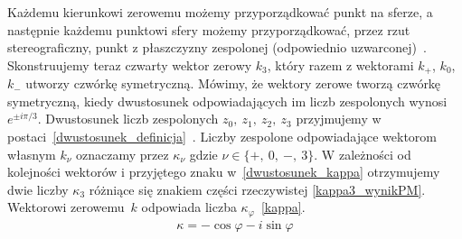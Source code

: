 Każdemu kierunkowi zerowemu możemy przyporządkować punkt na sferze,
a następnie każdemu punktowi sfery możemy przyporządkować,
przez rzut stereograficzny, 
punkt z płaszczyzny zespolonej 
(odpowiednio uzwarconej)~\cite{star1993algebra}.
Skonstruujemy teraz czwarty wektor zerowy $k_3$, który razem z 
wektorami $k_+$, $k_0$, $k_-$ utworzy czwórkę symetryczną.
Mówimy, że wektory zerowe tworzą czwórkę symetryczną,
 kiedy dwustosunek odpowiadających im liczb zespolonych 
 wynosi $e^{\pm i\pi/3}$.  
Dwustosunek liczb zespolonych $z_0,\ z_1,\ z_2,\ z_3$ przyjmujemy w 
postaci~\eqref{dwustosunek_definicja}~\cite{star1993algebra}.
Liczby zespolone odpowiadające wektorom własnym $k_\nu$ oznaczamy
przez $\kappa_\nu$ gdzie $\nu \in \{+,\ 0,\ -,\ 3\}$.
W zależności od kolejności wektorów i 
przyjętego znaku w~\eqref{dwustosunek_kappa}
otrzymujemy dwie liczby $\kappa_3$ różniące się znakiem części 
rzeczywistej \eqref{kappa3_wynikPM}. 
Wektorowi zerowemu~$k$ odpowiada liczba $\kappa_\varphi$~\eqref{kappa}.
\begin{align}\label{kappa}
\kappa = -\cos\varphi - i \sin \varphi
\end{align}
